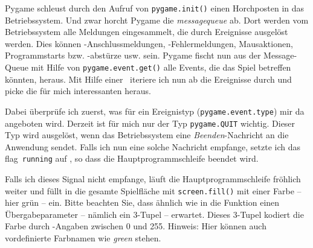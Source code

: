 Pygame schleust durch den Aufruf von \texttt{py\-game.\-init()} einen Horchposten in das Betriebssystem. Und zwar horcht Pygame die \emph{\Gls{messagequeue}} ab. Dort werden vom Betriebssystem alle Meldungen eingesammelt, die durch Ereignisse ausgelöst werden. Dies können -An\-schluss\-mel\-dungen, -Fehlermeldungen, Mausaktionen, Programmstarts bzw. -abstürze  usw. sein. Pygame fischt nun aus der Message-Queue mit Hilfe von \texttt{pygame.event.get()} alle Events, die das Spiel betreffen könnten, heraus. Mit Hilfe einer \forSchleife\ iteriere ich nun ab  die Ereignisse durch und picke die für mich interessanten heraus. 

Dabei überprüfe ich zuerst, was für ein Ereignistyp (\texttt{pygame.event.type}) mir da angeboten wird. Derzeit ist für mich nur der Typ \texttt{pygame.QUIT} wichtig. Dieser Typ wird ausgelöst, wenn das Betriebssystem eine \emph{Beenden}-Nachricht an die Anwendung sendet. Falls ich nun eine solche Nachricht empfange, setzte ich das \Gls{flag}\ \texttt{running} auf \false{}, so dass die Hauptprogrammschleife beendet wird.

Falls ich dieses Signal nicht empfange, läuft die Hauptprogrammschleife fröhlich weiter und füllt in  die gesamte Spielfläche mit \texttt{screen.fill()} mit einer Farbe -- hier grün -- ein. Bitte beachten Sie, dass ähnlich wie in  die Funktion einen Übergabeparameter -- nämlich ein 3-Tupel -- erwartet. Dieses 3-Tupel kodiert die Farbe durch -Angaben zwischen 0 und 255. Hinweis: Hier können auch vordefinierte Farbnamen wie \emph{green} stehen.


